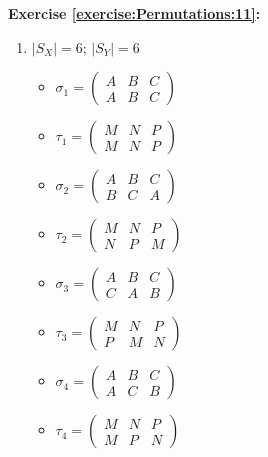 \noindent\textbf{Exercise \ref{exercise:Permutations:11}:} %
\begin{enumerate}[{a.}]
\item
$|S_X| = 6$; $|S_Y| = 6$\\
	\begin{multicols}{2}
	\begin{itemize}
	\item
	$\sigma_1 = \begin{pmatrix}
	A & B & C\\
	A & B & C
	\end{pmatrix}$

	\item
	$\tau_1 = \begin{pmatrix}
	M & N & P\\
	M & N & P
	\end{pmatrix}$

	\item
	$\sigma_2 = \begin{pmatrix}
	A & B & C\\
	B & C & A
	\end{pmatrix}$

	\item
	$\tau_2 = \begin{pmatrix}
	M & N & P\\
	N & P & M
	\end{pmatrix}$
	
	\item
	$\sigma_3 = \begin{pmatrix}
	A & B & C\\
	C & A & B
	\end{pmatrix}$

	\item
	$\tau_3 = \begin{pmatrix}
	M & N & P\\
	P & M & N
	\end{pmatrix}$\\

	\item
	$\sigma_4 = \begin{pmatrix}
	A & B & C\\
	A & C & B
	\end{pmatrix}$

	\item
	$\tau_4 = \begin{pmatrix}
	M & N & P\\
	M & P & N
	\end{pmatrix}$\\


\end{itemize}
\end{multicols}
\end{enumerate}
